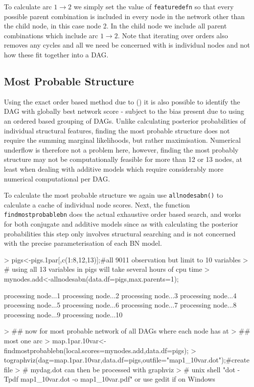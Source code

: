 \documentclass[nojss]{jss}
\begin{document}
To calculate arc $1\rightarrow2$ we simply set the value of {\tt featuredefn} so that every possible parent combination is included in every node in the network other than the child node, in this case node 2. In the child node we include all parent combinations which include arc $1\rightarrow2$. Note that iterating over orders also removes any cycles and all we need be concerned with is individual nodes and not how these fit together into a DAG.   

\subsection{Most Probable Structure}
Using the exact order based method due to \citeauthor{Koivisto2004} (\citeyear{Koivisto2004}) it is also possible to identify the DAG with globally best network score - subject to the bias present due to using an ordered based grouping of DAGs. Unlike calculating posterior probabilities of individual structural features, finding the most probable structure does not require the summing marginal likelihoods, but rather maximisation. Numerical underflow is therefore not a problem here, however, finding the most probably structure may not be computationally feasible for more than 12 or 13 nodes, at least when dealing with additive models which require considerably more numerical computational per DAG.

To calculate the most probable structure we again use {\tt allnodesabn()} to calculate a cache of individual node scores. Next, the function {\tt findmostprobablebn} does the actual exhaustive order based search, and works for both conjugate and additive models since as with calculating the posterior probabilities this step only involves structural searching and is not concerned with the precise parameterisation of each BN model.  

\begin{Schunk}
\begin{Sinput}
> pigs<-pigs.1par[,c(1:8,12,13)];#all 9011 observation but limit to 10 variables
> # using all 13 variables in pigs will take several hours of cpu time
> mynodes.add<-allnodesabn(data.df=pigs,max.parents=1); 
\end{Sinput}
\begin{Soutput}
processing node...1
processing node...2
processing node...3
processing node...4
processing node...5
processing node...6
processing node...7
processing node...8
processing node...9
processing node...10
\end{Soutput}
\begin{Sinput}
> ## now for most probable network of all DAGs where each node has at
> ## most one arc
> map.1par.10var<-findmostprobablebn(local.scores=mynodes.add,data.df=pigs);
> tographviz(dag=map.1par.10var,data.df=pigs,outfile="map1_10var.dot");#create file
> # mydag.dot can then be processed with graphviz
> # unix shell "dot -Tpdf map1_10var.dot -o map1_10var.pdf" or use gedit if on Windows
\end{Sinput}
\end{Schunk}
\end{document}
